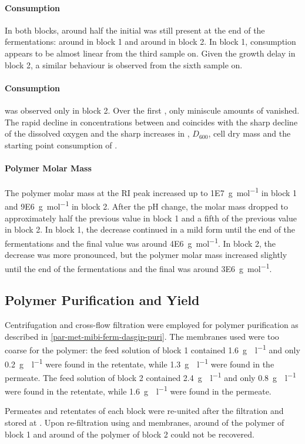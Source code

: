 \paragraph{\GLC{} Consumption}
In both blocks, around half the initial \glc{} was still present at the end of the fermentations: around  in block 1 and around  in block 2. In block 1, \glc{} consumption appears to be almost linear from the third sample on. Given the growth delay in block 2, a similar behaviour is observed from the sixth sample on.

\paragraph{\FUR{} Consumption}
\FUR{} was observed only in block 2. Over the first , only miniscule amounts of \fur{} vanished. The rapid decline in \fur{} concentrations between  and  coincides with the sharp decline of the dissolved oxygen and the sharp increases in , $D_{600}$, cell dry mass and the starting point consumption of \glc{}.

\paragraph{Polymer Molar Mass}
The polymer molar mass at the RI peak increased up to \SI{1E7}{\gram\per\mole} in block 1 and \SI{9E6}{\gram\per\mole} in block 2. After the pH change, the molar mass dropped to approximately half the previous value in block 1 and a fifth of the previous value in block 2. In block 1, the decrease continued in a mild form until the end of the fermentations and the final value was around \SI{4E6}{\gram\per\mole}. In block 2, the decrease was more pronounced, but the polymer molar mass increased slightly until the end of the fermentations and the final was around \SI{3E6}{\gram\per\mole}.

\subsection{Polymer Purification and Yield}
Centrifugation and cross-flow filtration were employed for polymer purification as described in \vref{par-met-mibi-ferm-dasgip-puri}. The  membranes used were too coarse for the polymer: the feed solution of block 1 contained \SI{1.6}{\gram\eps\per\litre} and only \SI{0.2}{\gram\eps\per\litre} were found in the retentate, while \SI{1.3}{\gram\eps\per\litre} were found in the permeate. The feed solution of block 2 contained \SI{2.4}{\gram\eps\per\litre} and only \SI{0.8}{\gram\eps\per\litre} were found in the retentate, while \SI{1.6}{\gram\eps\per\litre} were found in the permeate.

Permeates and retentates of each block were re-united after the filtration and stored at . Upon re-filtration using  and  membranes, around  of the polymer of block 1 and around  of the polymer of block 2 could not be recovered.

